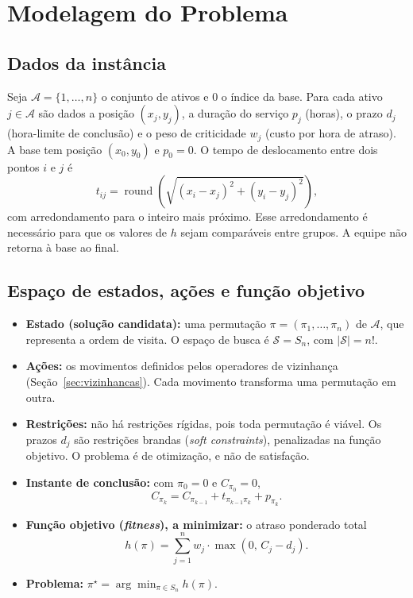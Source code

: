 \section{Modelagem do Problema}\label{sec:modelagem}

\subsection{Dados da instância}

Seja $\mathcal{A}=\{1,\dots,n\}$ o conjunto de ativos e $0$ o índice da base. Para cada ativo $j\in\mathcal{A}$ são dados a posição $(x_j,y_j)$, a duração do serviço $p_j$ (horas), o prazo $d_j$ (hora-limite de conclusão) e o peso de criticidade $w_j$ (custo por hora de atraso). A base tem posição $(x_0,y_0)$ e $p_0=0$. O tempo de deslocamento entre dois pontos $i$ e $j$ é
\begin{equation}
  t_{ij}=\operatorname{round}\!\left(\sqrt{(x_i-x_j)^2+(y_i-y_j)^2}\right),
  \label{eq:tij}
\end{equation}
com arredondamento para o inteiro mais próximo. Esse arredondamento é necessário para que os valores de $h$ sejam comparáveis entre grupos. A equipe não retorna à base ao final.

\subsection{Espaço de estados, ações e função objetivo}

\begin{itemize}
  \item \textbf{Estado (solução candidata):} uma permutação $\pi=(\pi_1,\dots,\pi_n)$ de $\mathcal{A}$, que representa a ordem de visita. O espaço de busca é $\mathcal{S}=S_n$, com $|\mathcal{S}|=n!$.
  \item \textbf{Ações:} os movimentos definidos pelos operadores de vizinhança (Seção~\ref{sec:vizinhancas}). Cada movimento transforma uma permutação em outra.
  \item \textbf{Restrições:} não há restrições rígidas, pois toda permutação é viável. Os prazos $d_j$ são restrições brandas (\textit{soft constraints}), penalizadas na função objetivo. O problema é de otimização, e não de satisfação.
  \item \textbf{Instante de conclusão:} com $\pi_0=0$ e $C_{\pi_0}=0$,
  \begin{equation}
    C_{\pi_k}=C_{\pi_{k-1}}+t_{\pi_{k-1}\pi_k}+p_{\pi_k}.
    \label{eq:conclusao}
  \end{equation}
  \item \textbf{Função objetivo (\textit{fitness}), a minimizar:} o atraso ponderado total
  \begin{equation}
    h(\pi)=\sum_{j=1}^{n} w_j\cdot\max(0,\,C_j-d_j).
    \label{eq:h}
  \end{equation}
  \item \textbf{Problema:} $\pi^\star=\arg\min_{\pi\in S_n}h(\pi)$.
\end{itemize}

